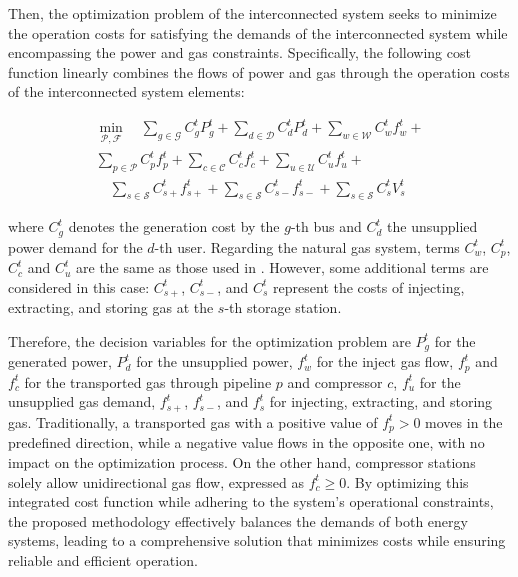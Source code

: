 Then, the optimization problem of the interconnected system seeks to minimize the operation costs for satisfying the demands of the interconnected system while encompassing the power and gas constraints. Specifically, the following cost function linearly combines the flows of power and gas through the operation costs of the interconnected system elements:

\begin{equation} \label{eq:obj_func_integrated}
\begin{split}
\min_{\mathcal{P}, \mathcal{F}} \quad  \sum_{g \in \mathcal{G}} C_{g}^t {P_{g}^t} + \sum_{d \in \mathcal{D}} C_{d}^t {P_{d}^t} +  \sum_{w \in \mathcal{W}} C_{w}^t {f_{w}^t} + \\ \sum_{p \in \mathcal{P}} C_{p}^t {f_{p}^t}  + \sum_{c \in \mathcal{C}} C_{c}^t {f_{c}^t} + \sum_{u \in \mathcal{U}} C_{u}^{t} {f_{u}^{t}} + \\ \quad \sum_{s \in \mathcal{S}} C_{s+}^{t} {f_{s+}^{t}}  + \sum_{s \in \mathcal{S}} C_{s-}^{t} {f_{s-}^{t}} + \sum_{s \in \mathcal{S}} C_{s}^{t} {V_{s}^{t}}
\end{split}
\end{equation}

\noindent where $C_g^t$ denotes the generation cost by the $g$-th bus and $C_d^t$ the unsupplied power demand for the $d$-th user. Regarding the natural gas system, terms $C_w^t$, $C_p^t$, $C_c^t$ and $C_u^t$ are the same as those used in . However, some additional terms are considered in this case: $C_{s+}^t$, $C_{s-}^t$, and $C_{s}^t$ represent the costs of injecting, extracting, and storing gas at the $s$-th storage station.

Therefore, the decision variables for the optimization problem are $P_g^t$ for the generated power, $P_d^t$ for the unsupplied power, $f_w^t$ for the inject gas flow, $f_p^t$ and $f_c^t$ for the transported gas through pipeline $p$ and compressor $c$, $f_u^t$ for the unsupplied gas demand, $f_{s+}^t$, $f_{s-}^t$, and $f_{s}^t$ for injecting, extracting, and storing gas. Traditionally, a transported gas with a positive value of $ f_ { p } ^t>0 $ moves in the predefined direction, while a negative value flows in the opposite one, with no impact on the optimization process. On the other hand, compressor stations solely allow unidirectional gas flow, expressed as $f_{c}^t\geq0$. By optimizing this integrated cost function while adhering to the system's operational constraints, the proposed methodology effectively balances the demands of both energy systems, leading to a comprehensive solution that minimizes costs while ensuring reliable and efficient operation.

